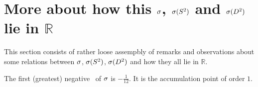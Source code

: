 






\section{More about how this ${\sigma}$, ${{\sigma}(S^2)}$ and ${{\sigma}(D^2)}$ lie in $\mathbb{R}$}
This section consists of rather loose assempbly of remarks and observations about some 
relations between ${\sigma}$, ${{\sigma}(S^2)}$, ${{\sigma}(D^2)}$ and how they all lie in $\mathbb{R}$.
\begin{observation}
The first (greatest) negative \apots\ of ${\sigma}$ is 
$-\frac{1}{12}$. It is the accumulation point of order $1$. 
\end{observation}
